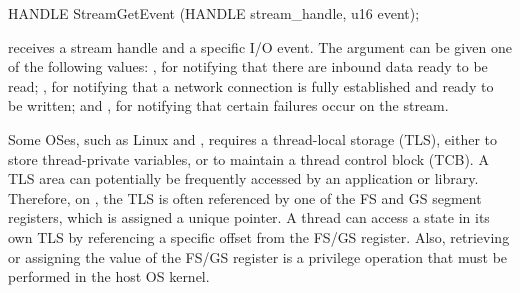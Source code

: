 \begin{paldef}
HANDLE StreamGetEvent (HANDLE stream_handle, u16 event);
\end{paldef}


 receives a stream handle and a specific I/O event.
The  argument can be given
one of the following values:
, for notifying that there are inbound data ready to be read;
, for notifying
that a network connection is fully established
and ready to be written;
and , for notifying that certain failures occur on the stream.





Some OSes, such as Linux and \win{}, requires a thread-local storage (TLS),
either to store thread-private variables, or to maintain a thread control block (TCB).
A TLS area can potentially be frequently accessed by an application or library.
Therefore, on \graphenearch{},
the TLS is often referenced by one of the FS and GS segment registers,
which is assigned a unique pointer.
A thread can access a state in its own TLS by referencing a specific offset from the FS/GS register.
Also, retrieving or assigning the value of the FS/GS register
is a privilege operation
that must be performed in the host OS kernel.







